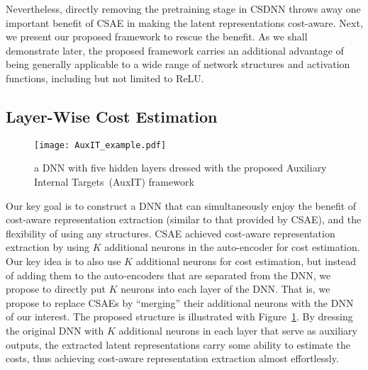 \documentclass[a4paper]{article}
\begin{document}
  Nevertheless, directly removing the pretraining stage in CSDNN throws away one important benefit of CSAE in making the latent representations cost-aware.
  Next, we present our proposed framework to rescue the benefit.
  As we shall demonstrate later, the proposed framework carries an additional advantage of being generally applicable to a wide range of network structures and activation functions, including but not limited to ReLU.


\subsection{Layer-Wise Cost Estimation}
  \label{sec:csaux}
  \begin{figure}
    \centering
    \texttt{[image: AuxIT\_example.pdf]}
    \caption{
      a DNN with five hidden layers dressed with the proposed Auxiliary Internal Targets~(AuxIT) framework
    }
    \label{fig:AuxIT_example}
  \end{figure}

  Our key goal is to construct a DNN that can simultaneously enjoy the benefit of cost-aware representation extraction (similar to that provided by CSAE), and the flexibility of using any structures.
  CSAE achieved cost-aware representation extraction by using $K$ additional neurons in the auto-encoder for cost estimation. Our key idea is to also use $K$ additional neurons for cost estimation, but instead of adding them to the auto-encoders that are separated from the DNN, we propose to directly put $K$ neurons into each layer of the DNN. That is, we propose to replace CSAEs by ``merging'' their additional neurons with the DNN of our interest.
  The proposed structure is illustrated with Figure~\ref{fig:AuxIT_example}.
  By dressing the original DNN with $K$ additional neurons in each layer that serve as auxiliary outputs, 
  the extracted latent representations carry some ability to estimate the costs, thus achieving cost-aware representation extraction almost effortlessly.
\end{document}

